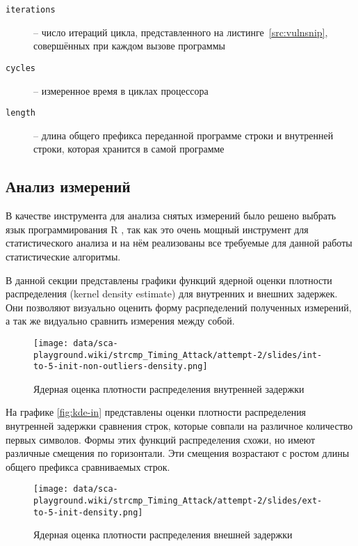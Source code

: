 \begin{description}
\item [\texttt{iterations}] -- число итераций цикла, представленного на
  листинге~\ref{src:vulnsnip}, совершённых при каждом вызове программы 
\item [\texttt{cycles}] -- измеренное время в циклах процессора
\item [\texttt{length}] -- длина общего префикса переданной программе  строки и
  внутренней строки, которая хранится в самой программе
\end{description}

\subsection{Анализ измерений}

В качестве инструмента для анализа снятых измерений было решено выбрать язык программирования
R \cite{r}, так как это очень мощный инструмент для статистического анализа и на нём реализованы
все требуемые для данной работы статистические алгоритмы.

В данной секции представлены графики функций ядерной оценки плотности
распределения (kernel density estimate) для внутренних и внешних задержек.
Они позволяют визуально оценить форму расрпеделений полученных измерений, а так же
видуально сравнить измерения между собой.

\begin{figure}
    \centering
    \texttt{[image: data/sca-playground.wiki/strcmp\_Timing\_Attack/attempt-2/slides/int-to-5-init-non-outliers-density.png]}
    \caption{Ядерная оценка плотности распределения внутренней задержки}
\end{figure} \label{fig:kde-in}

На графике \ref{fig:kde-in} представлены оценки плотности распределения
внутренней задержки сравнения строк, которые совпали на различное количество
первых символов. Формы этих функций распределения схожи, но имеют различные
смещения по горизонтали. Эти смещения возрастают с ростом длины общего префикса
сравниваемых строк.

\begin{figure}
    \centering
    \texttt{[image: data/sca-playground.wiki/strcmp\_Timing\_Attack/attempt-2/slides/ext-to-5-init-density.png]}
    \caption{Ядерная оценка плотности распределения внешней задержки}
\end{figure} \label{fig:kde-out}

